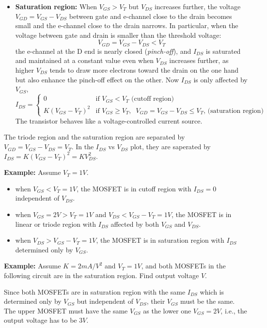 \begin{itemize}
\begin{itemize}
  \item {\bf Saturation region:} When $V_{GS}>V_T$ but $V_{DS}$ increases 
    further, the voltage $V_{GD}=V_{GS}-V_{DS}$ between gate and e-channel 
    close to the drain becomes small and the e-channel close to the drain
    narrows. In particular, when the voltage between gate and drain is
    smaller than the threshold voltage:
    \[ 
    V_{GD}=V_{GS}-V_{DS}<V_T 
    \]
    the e-channel at the D end is nearly closed ({\em pinch-off}), and
    $I_{DS}$ is saturated and maintained at a constant value even when
    $V_{DS}$ increases further, as higher $V_{DS}$ tends to draw more 
    electrons toward the drain on the one hand but also enhance the 
    pinch-off effect on the other. Now $I_{DS}$ is only affected by $V_{GS}$, 
    \[ 
    I_{DS}=\left\{ \begin{array}{ll}
      0 & \mbox{if $V_{GS}<V_T$ (cutoff region)} \\
      K(V_{GS}-V_T)^2 & \mbox{if $V_{GS}\ge V_T,\;\;V_{GD}=V_{GS}-V_{DS}\le V_T$,
        (saturation region)}       
    \end{array} \right. 
    \]
    The transistor behaves like a voltage-controlled current source. 
 \end{itemize}
The triode region and the saturation region are separated by 
$V_{GD}=V_{GS}-V_{DS}=V_T$. In the $I_{DS}$ vs $V_{DS}$ plot, they are
saperated by $I_{DS}=K(V_{GS}-V_T)^2=KV_{DS}^2$.

{\bf Example:} Assume $V_T=1V$.
\begin{itemize}
\item when $V_{GS}<V_T=1V$, the MOSFET is in cutoff region with $I_{DS}=0$ 
  independent of $V_{DS}$.
\item when $V_{GS}=2V > V_T=1V$ and $V_{DS}<V_{GS}-V_T=1V$, the MOSFET is in 
  linear or triode region with $I_{DS}$ affected by both $V_{GS}$ and $V_{DS}$.
\item when $V_{DS}>V_{GS}-V_T=1V$, the MOSFET is in saturation region with
  $I_{DS}$ determined only by $V_{GS}$.
\end{itemize}

{\bf Example:} Assume $K=2 mA/V^2$ and $V_T=1V$, and both MOSFETs in the
following circuit are in the saturation region. Find output voltage $V$.


Since both MOSFETs are in saturation region with the same $I_{DS}$ which is
determined only by $V_{GS}$ but independent of $V_{DS}$, their $V_{GS}$ must 
be the same. The upper MOSFET must have the same $V_{GS}$ as the lower one 
$V_{GS}=2V$, i.e., the output voltage has to be $3V$.


\end{itemize}
